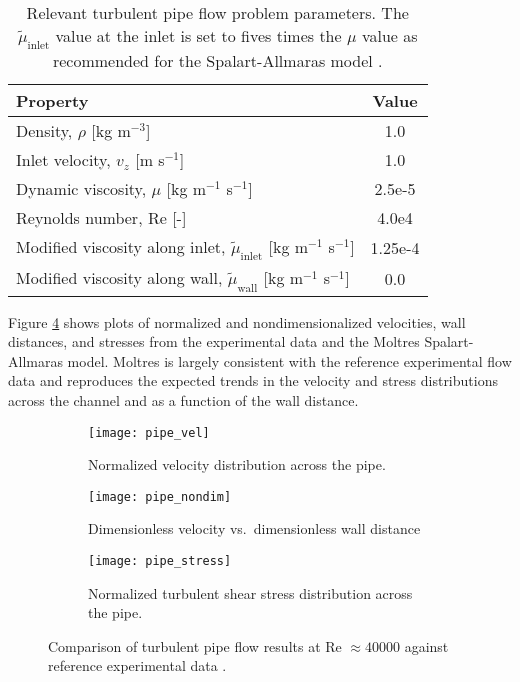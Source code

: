 \begin{table}[htb]
  \centering
  \small
  \caption{Relevant turbulent pipe flow problem parameters. The $\tilde{\mu}_\text{inlet}$ value
  at the inlet is set to fives times the $\mu$ value as recommended for the Spalart-Allmaras model
  \cite{spalart_one-equation_1994}.}
  \begin{tabular}{l S}
    \toprule
    Property & {Value} \\
    \midrule
    Density, $\rho$ [kg m$^{-3}$] & 1.0 \\
    Inlet velocity, $v_z$ [m s$^{-1}$] & 1.0 \\
    Dynamic viscosity, $\mu$ [kg m$^{-1}$ s$^{-1}$] & 2.5e-5 \\
    Reynolds number, Re [-] & 4.0e4 \\
    Modified viscosity along inlet, $\tilde{\mu}_\text{inlet}$ [kg m$^{-1}$ s$^{-1}$] & 1.25e-4 \\
    Modified viscosity along wall, $\tilde{\mu}_\text{wall}$ [kg m$^{-1}$ s$^{-1}$] & 0.0 \\
    \bottomrule
  \end{tabular}
  \label{table:pipe}
\end{table}

Figure \ref{fig:pipe-verification} shows plots of normalized and nondimensionalized velocities,
wall distances, and stresses from the experimental data \cite{laufer_structure_1954}
and the Moltres Spalart-Allmaras model. Moltres is largely consistent with the reference
experimental flow data and reproduces the expected trends in the velocity and stress distributions
across the channel and as a function of the wall distance.

\begin{figure}[p]
  \centering
  \begin{subfigure}[b]{0.48\columnwidth}
    \centering
    \texttt{[image: pipe\_vel]}
    \caption{Normalized velocity distribution across the pipe.}
    \label{fig:pipe-vel}
  \end{subfigure}
  \hfill
  \begin{subfigure}[b]{0.48\columnwidth}
    \centering
    \texttt{[image: pipe\_nondim]}
    \caption{Dimensionless velocity vs.\ dimensionless wall distance}
    \label{fig:pipe-nondim}
  \end{subfigure}
  \begin{subfigure}[b]{0.48\columnwidth}
    \centering
    \texttt{[image: pipe\_stress]}
    \caption{Normalized turbulent shear stress distribution across the pipe.}
    \label{fig:pipe-stress}
  \end{subfigure}
  \caption{Comparison of turbulent pipe flow results at Re $\approx 40000$ against reference
  experimental data \cite{laufer_structure_1954}.}
  \label{fig:pipe-verification}
\end{figure}

